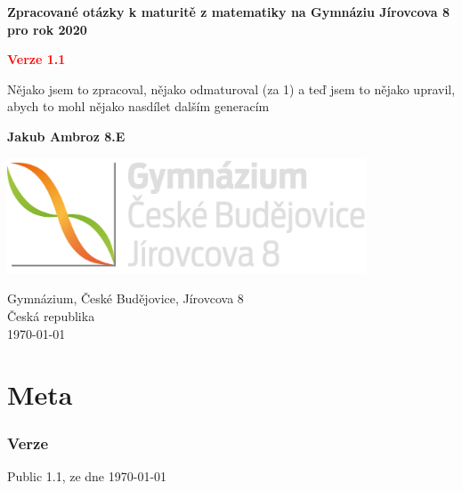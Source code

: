 \documentclass[12pt]{article}
\begin{document}
\begin{titlepage}
   \begin{center}
       \vspace*{1cm}
		
		\begin{Huge}
		 \textbf{Zpracované otázky k maturitě z matematiky na Gymnáziu Jírovcova 8 pro rok 2020}\\
		\end{Huge}
		\begin{LARGE}
		\textbf{\textcolor{red}{Verze 1.1}}
		\end{LARGE}


       \vspace{0.5cm}
       Nějako jsem to zpracoval, nějako odmaturoval (za 1) a teď jsem to nějako upravil, abych to mohl nějako nasdílet dalším generacím
            
       \vspace{1.5cm}
		\begin{LARGE}
		\textbf{Jakub Ambroz 8.E}
		\end{LARGE}
       

       \vfill
            
            
       \vspace{0.8cm}
     
       \includegraphics[width=0.8\textwidth]{logo-src.png}
       
       Gymnázium, České Budějovice, Jírovcova 8\\
       Česká republika\\
       \today
            
   \end{center}
\end{titlepage}

\section*{Meta}
\subsubsection{Verze}
Public 1.1, ze dne \today
\end{document}
